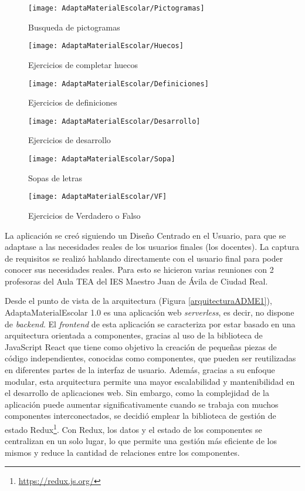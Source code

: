 \begin{figure}[ht!]
    \centering
    \texttt{[image:  AdaptaMaterialEscolar/Pictogramas]}
    \caption{Busqueda de pictogramas}
    \label{Pictogramas}
\end{figure}
\begin{figure}[ht!]
    \centering
    \texttt{[image:  AdaptaMaterialEscolar/Huecos]}
    \caption{Ejercicios de completar huecos}
    \label{Huecos}
\end{figure}
\begin{figure}[ht!]
    \centering
    \texttt{[image:  AdaptaMaterialEscolar/Definiciones]}
    \caption{Ejercicios de definiciones}
    \label{Definiciones}
\end{figure}
\begin{figure}[ht!]
    \centering
    \texttt{[image:  AdaptaMaterialEscolar/Desarrollo]}
    \caption{Ejercicios de desarrollo}
    \label{Desarrollo}
\end{figure}
\begin{figure}[ht!]
    \centering
    \texttt{[image:  AdaptaMaterialEscolar/Sopa]}
    \caption{Sopas de letras}
    \label{Sopa}
\end{figure}
\begin{figure}[ht!]
    \centering
    \texttt{[image:  AdaptaMaterialEscolar/VF]}
    \caption{Ejercicios de Verdadero o Falso}
    \label{VF}
\end{figure}
La aplicación se creó siguiendo un Diseño Centrado en el Usuario, para que se adaptase a las necesidades reales de los usuarios finales (los docentes). La captura de requisitos se realizó hablando directamente con el usuario final para poder conocer sus necesidades reales. Para esto se hicieron varias reuniones con 2 profesoras del Aula TEA del IES Maestro Juan de Ávila de Ciudad Real.

Desde el punto de vista de la arquitectura (Figura \ref{arquitecturaADME1}), AdaptaMaterialEscolar 1.0 es una aplicación web \textit{serverless}, es decir, no dispone de \textit{backend}. El \textit{frontend} de esta aplicación se caracteriza por estar basado en una arquitectura orientada a componentes, gracias al uso de la biblioteca de JavaScript React que tiene como objetivo la creación de pequeñas piezas de código independientes, conocidas como componentes, que pueden ser reutilizadas en diferentes partes de la interfaz de usuario. Además, gracias a su enfoque modular, esta arquitectura permite una mayor escalabilidad y mantenibilidad en el desarrollo de aplicaciones web. Sin embargo, como la complejidad de la aplicación puede aumentar significativamente cuando se trabaja con muchos componentes interconectados, se decidió emplear la biblioteca de gestión de estado Redux\footnote{\url{https://redux.js.org/}}. Con Redux, los datos y el estado de los componentes se centralizan en un solo lugar, lo que permite una gestión más eficiente de los mismos y reduce la cantidad de relaciones entre los componentes.

